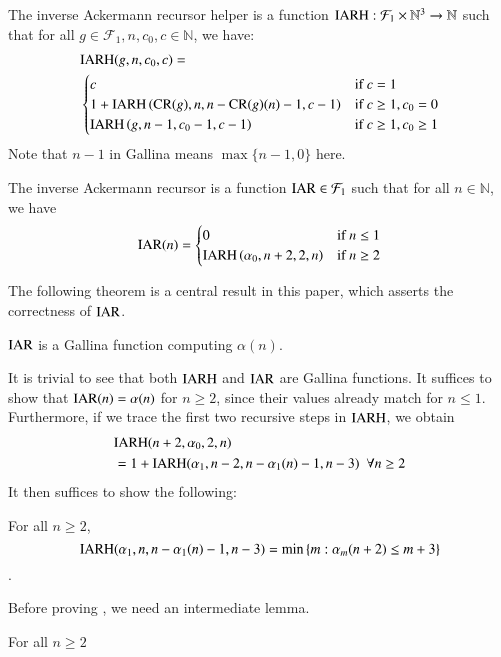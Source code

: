 \begin{defn}  \label{defn: inv_ack_recursor_helper}
The inverse Ackermann recursor helper is a function $\text{IARH} : \mathcal{F}_1\times \mathbb{N}^3 \to \mathbb{N}$ such that for all $g\in \mathcal{F}_1, n, c_0, c\in \mathbb{N}$, we have:
\begin{equation}
\begin{aligned}
& \text{IARH}(g, n, c_0, c) =  \\
& \begin{cases}
c & \text{if } c = 1 \\
1 + \text{IARH}\left(\text{CR}(g), n, n - \text{CR}(g)(n) - 1, c - 1\right) & \text{if } c \ge 1, c_0 = 0 \\
\text{IARH}\left(g, n - 1, c_0 - 1, c - 1\right) & \text{if } c \ge 1, c_0 \ge 1
\end{cases}
\end{aligned}
\end{equation}
Note that $n - 1$ in Gallina means $\max\{n-1, 0\}$ here.
\end{defn}

\begin{defn}  \label{defn: inv_ack_recursor}
The inverse Ackermann recursor is a function $\text{IAR} \in \mathcal{F}_1$ such that for all $n\in \mathbb{N}$, we have
\begin{equation}
\text{IAR}(n) = \begin{cases}
0 & \text{if } n \le 1 \\ \text{IARH}\left(\alpha_0, n + 2, 2, n\right) & \text{if } n\ge 2
\end{cases}
\end{equation}
\end{defn}

The following theorem is a central result in this paper, which asserts the correctness of $\text{IAR}$.

\begin{thm} \label{thm: inv_ack_correct}
$\text{IAR}$ is a Gallina function computing $\alpha(n)$.
\end{thm}

It is trivial to see that both $\text{IARH}$ and $\text{IAR}$ are Gallina functions. It suffices to show that $\text{IAR}(n) = \alpha(n)$ for $n\ge 2$, since their values already match for $n\le 1$. Furthermore, if we trace the first two recursive steps in $\text{IARH}$, we obtain
\begin{equation*}
\begin{aligned}
& \text{IARH}(n+2, \alpha_0, 2, n) \\
& = 1 + \text{IARH}(\alpha_1, n-2, n-\alpha_1(n)-1, n-3) \ \ \forall n\ge 2
\end{aligned}
\end{equation*}
It then suffices to show the following:

\begin{lem}  \label{lem: inv_ack_rec_helper}
For all $n\ge 2$,
$$\text{IARH}(\alpha_1, n, n - \alpha_1(n) - 1, n - 3) = \min\left\{m : \alpha_m(n+2)\le m+3 \right\}$$.
\end{lem}

Before proving , we need an intermediate lemma.

\begin{lem}
For all $n\ge 2$
\end{lem}